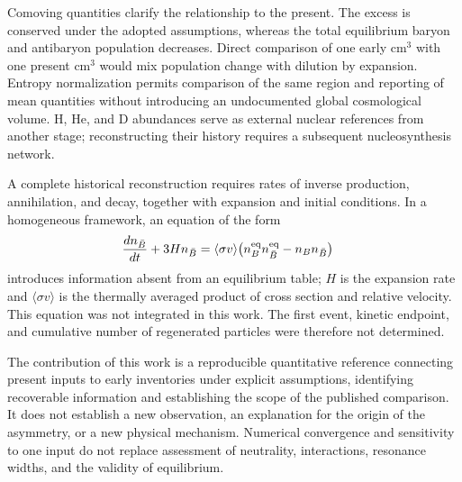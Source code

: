Comoving quantities clarify the relationship to the present. The excess is conserved under the adopted assumptions, whereas the total equilibrium baryon and antibaryon population decreases. Direct comparison of one early cm$^3$ with one present cm$^3$ would mix population change with dilution by expansion. Entropy normalization permits comparison of the same region and reporting of mean quantities without introducing an undocumented global cosmological volume. H, He, and D abundances serve as external nuclear references from another stage; reconstructing their history requires a subsequent nucleosynthesis network.

A complete historical reconstruction requires rates of inverse production, annihilation, and decay, together with expansion and initial conditions. In a homogeneous framework, an equation of the form
\begin{align}
\frac{dn_{\bar B}}{dt}+3Hn_{\bar B}
&=\langle\sigma v\rangle\bigl(n_B^{\rm eq}n_{\bar B}^{\rm eq}
-n_Bn_{\bar B}\bigr)\label{eq:kinetic}
\end{align}
introduces information absent from an equilibrium table; $H$ is the expansion rate and $\langle\sigma v\rangle$ is the thermally averaged product of cross section and relative velocity. This equation was not integrated in this work. The first event, kinetic endpoint, and cumulative number of regenerated particles were therefore not determined.

The contribution of this work is a reproducible quantitative reference connecting present inputs to early inventories under explicit assumptions, identifying recoverable information and establishing the scope of the published comparison. It does not establish a new observation, an explanation for the origin of the asymmetry, or a new physical mechanism. Numerical convergence and sensitivity to one input do not replace assessment of neutrality, interactions, resonance widths, and the validity of equilibrium.
